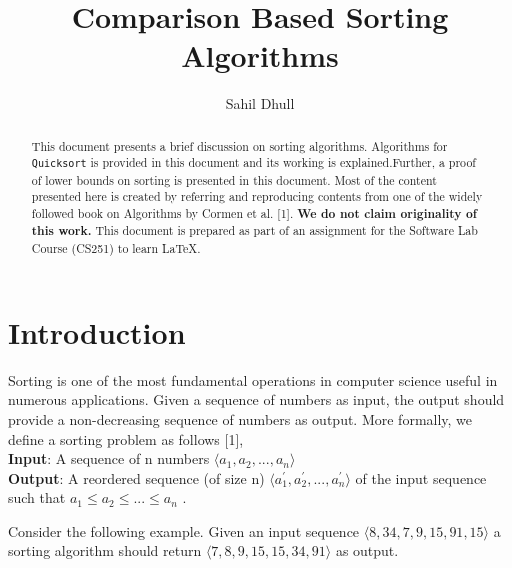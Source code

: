 \documentclass[a4paper, 10pt,twocolumn]{article}
\title{Comparison Based Sorting Algorithms}
\author{Sahil Dhull}
\date{}
\begin{document}
\maketitle
\begin{abstract}
  This document presents a brief discussion on sorting algorithms. Algorithms for \texttt{Quicksort} is provided in this document and its working is explained.Further, a proof of lower bounds on sorting is presented in this document. Most of the content presented here is created by referring and reproducing contents from one of the widely followed book on Algorithms by Cormen et al. [1]. {\bf We do not claim originality of this work.} This document is prepared as part of an assignment for the Software Lab Course (CS251) to learn \LaTeX .
    \noindent{}
\end{abstract}
\section{Introduction}
Sorting is one of the most fundamental operations in computer science useful in numerous applications. Given a sequence of numbers as input, the output should provide a non-decreasing sequence of numbers as output. More formally, we define a sorting problem as follows [1],
\\{\bf Input}: A sequence of n numbers  $ \langle a_1,a_2,...,a_n \rangle $
\\{\bf Output}: A reordered sequence (of size n) $ \langle a_1^{'} ,a_2^{'} ,...,a_n^{'} \rangle$ of the input sequence such that $ a_1 \leq a_2 \leq ... \leq a_n $ .

Consider the following example. Given an input sequence $\langle 8, 34, 7, 9, 15, 91, 15 \rangle$ a sorting algorithm should return $\langle 7, 8, 9, 15, 15, 34, 91 \rangle$ as output.
\end{document}
